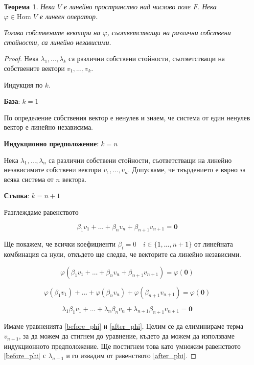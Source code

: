 \documentclass{scrartcl}
\newtheorem{theorem}{Теорема}
\begin{document}
\begin{FlushLeft}
\begin{theorem}\label{theorem_linear_independency}
Нека $V$ е линейно пространство над числово поле $F$.
Нека $\varphi \in \text{Hom }{V}$ е линеен оператор.

Тогава собствените вектори на $\varphi$, съответстващи на различни собствени стойности, са линейно независими.
\end{theorem}

\begin{proof}
Нека $\lambda_1, \dots, \lambda_k$ са различни собствени стойности, съответстващи на собствените вектори $v_1, \dots, v_k$.

Индукция по $k$.

\textbf{База}: $k= 1$

По определение собствения вектор е ненулев и знаем, че система от един ненулев вектор е линейно независима.

\textbf{Индукционно предположение}: $k = n$

Нека $\lambda_1, \dots, \lambda_n$ са различни собствени стойности, съответстващи на линейно независимите собствени вектори $v_1, \dots, v_n$. Допускаме, че твърдението е вярно за всяка система от $n$ вектора.

\textbf{Стъпка}: $k = n + 1$

Разглеждаме равенството

\begin{equation}
    \beta_1 v_1 + \dots + \beta_n v_n + \beta_{n+1} v_{n+1} = \mathbf{0} \label{before_phi}
\end{equation}

Ще покажем, че всички коефициенти $\beta_i = 0 \quad i \in \{1, \dots, n+1\}$ от линейната комбинация са нули, откъдето ще следва, че векторите са линейно независими.

$$\varphi(\beta_1 v_1 + \dots + \beta_n v_n + \beta_{n+1} v_{n+1}) = \varphi(\mathbf{0})$$

$$\varphi(\beta_1 v_1) + \dots + \varphi(\beta_n v_n) + \varphi(\beta_{n+1} v_{n+1}) = \varphi(\mathbf{0})$$

\begin{equation}
    \lambda_1\beta_1 v_1 + \dots + \lambda_n\beta_n v_n + \lambda_{n+1}\beta_{n+1} v_{n+1} = \mathbf{0} \label{after_phi}
\end{equation}

Имаме уравненията \eqref{before_phi} и \eqref{after_phi}. Целим се да елиминираме терма $v_{n+1}$, за да можем да стигнем до уравнение, където да можем да използваме индукционното предположение. Ще постигнем това като умножим равенството \eqref{before_phi} с $\lambda_{n+1}$ и го извадим от равенството \eqref{after_phi}.


\end{proof}
\end{FlushLeft}
\end{document}
